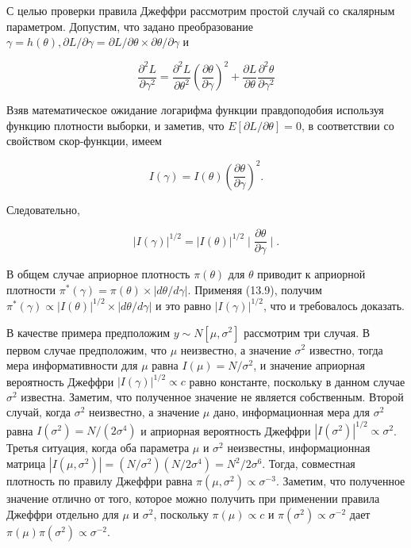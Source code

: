 С целью проверки правила Джеффри рассмотрим простой случай со скалярным параметром. Допустим, что задано преобразование $\gamma=h(\theta), \partial{L}/\partial\gamma=\partial{L}/\partial\theta{\times}\partial\theta/\partial\gamma$ и

\[
\dfrac{\partial^{2}L}{\partial\gamma^{2}}=\dfrac{\partial^{2}L}{\partial\theta^{2}}\left( \dfrac{\partial\theta}{\partial\gamma}\right)^{2}+\dfrac{\partial{L}}{\partial\theta}\dfrac{\partial^{2}\theta}{\partial\gamma^{2}}
\]

Взяв математическое ожидание логарифма функции правдоподобия используя функцию плотности выборки, и заметив, что $E[\partial{L}/\partial\theta]=0$, в соответствии со свойством скор-функции, имеем

\[
I(\gamma)=I(\theta)\left(\dfrac{\partial\theta}{\partial\gamma}\right)^{2}.
\]

Следовательно,

\[
|I(\gamma)|^{1/2}=|I(\theta)|^{1/2}\mid\dfrac{\partial\theta}{\partial\gamma}\mid.
\]

В общем случае априорное плотность $\pi(\theta)$ для $\theta$ приводит к априорной плотности $\pi^{*}(\gamma)=\pi(\theta){\times}|d\theta/d\gamma|$. Применяя (13.9), получим $\pi^{*}(\gamma)\propto|I(\theta)|^{1/2}{\times}|d\theta/d\gamma|$ и это  равно $|I(\gamma)|^{1/2}$, что и требовалось доказать.

В качестве примера предположим $y{\sim}N[\mu,\sigma^{2}]$  рассмотрим три случая. В первом случае предположим, что $\mu$ неизвестно, а значение $\sigma^{2}$ известно, тогда мера информативности для $\mu$ равна $I(\mu)=N/\sigma^{2}$, и значение априорная вероятность Джеффри $|I(\gamma)|^{1/2}{\propto}c$ равно константе, поскольку в данном случае $\sigma^{2}$ известна. Заметим, что полученное значение не является собственным. Второй случай, когда $\sigma^{2}$ неизвестно, а значение $\mu$ дано, информационная мера для $\sigma^{2}$ равна $I(\sigma^{2})=N/(2\sigma^{4})$ и априорная вероятность Джеффри $|I(\sigma^{2})|^{1/2}\propto\sigma^{2}$. Третья ситуация, когда оба параметра $\mu$ и $\sigma^{2}$ неизвестны, информационная матрица $|I{(\mu,\sigma^{2})}|=(N/\sigma^{2})(N/2\sigma^{4})=N^{2}/2\sigma^{6}$. Тогда, совместная плотность по правилу Джеффри равна $\pi(\mu,\sigma^{2})\propto\sigma^{-3}$. Заметим, что полученное значение отлично от того, которое можно  получить при применении правила Джеффри  отдельно для $\mu$ и $\sigma^{2}$, поскольку $\pi(\mu)\propto{c}$ и $\pi(\sigma^{2})\propto\sigma^{-2}$ дает $\pi(\mu)\pi(\sigma^{2})\propto\sigma^{-2}$. 

